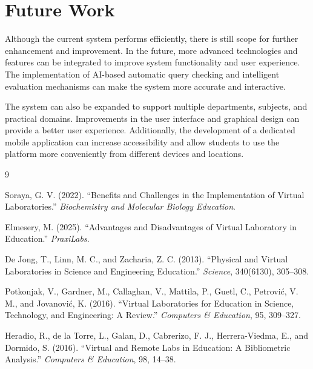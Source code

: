 \documentclass{SSBT-BE}
\begin{document}
\section*{Future Work}

Although the current system performs efficiently, there is still scope for further enhancement and improvement. In the future, more advanced technologies and features can be integrated to improve system functionality and user experience. The implementation of AI-based automatic query checking and intelligent evaluation mechanisms can make the system more accurate and interactive.

The system can also be expanded to support multiple departments, subjects, and practical domains. Improvements in the user interface and graphical design can provide a better user experience. Additionally, the development of a dedicated mobile application can increase accessibility and allow students to use the platform more conveniently from different devices and locations.





\begin{thebibliography}{9}

Soraya, G. V. (2022).
``Benefits and Challenges in the Implementation of Virtual Laboratories.''
\textit{Biochemistry and Molecular Biology Education}.

Elmesery, M. (2025).
``Advantages and Disadvantages of Virtual Laboratory in Education.''
\textit{PraxiLabs}.

De Jong, T., Linn, M. C., and Zacharia, Z. C. (2013).
``Physical and Virtual Laboratories in Science and Engineering Education.''
\textit{Science}, 340(6130), 305--308.

Potkonjak, V., Gardner, M., Callaghan, V., Mattila, P., Guetl, C., Petrovi\'c, V. M., and Jovanovi\'c, K. (2016).
``Virtual Laboratories for Education in Science, Technology, and Engineering: A Review.''
\textit{Computers \& Education}, 95, 309--327.

Heradio, R., de la Torre, L., Galan, D., Cabrerizo, F. J., Herrera-Viedma, E., and Dormido, S. (2016).
``Virtual and Remote Labs in Education: A Bibliometric Analysis.''
\textit{Computers \& Education}, 98, 14--38.

\end{thebibliography}

\end{document}

